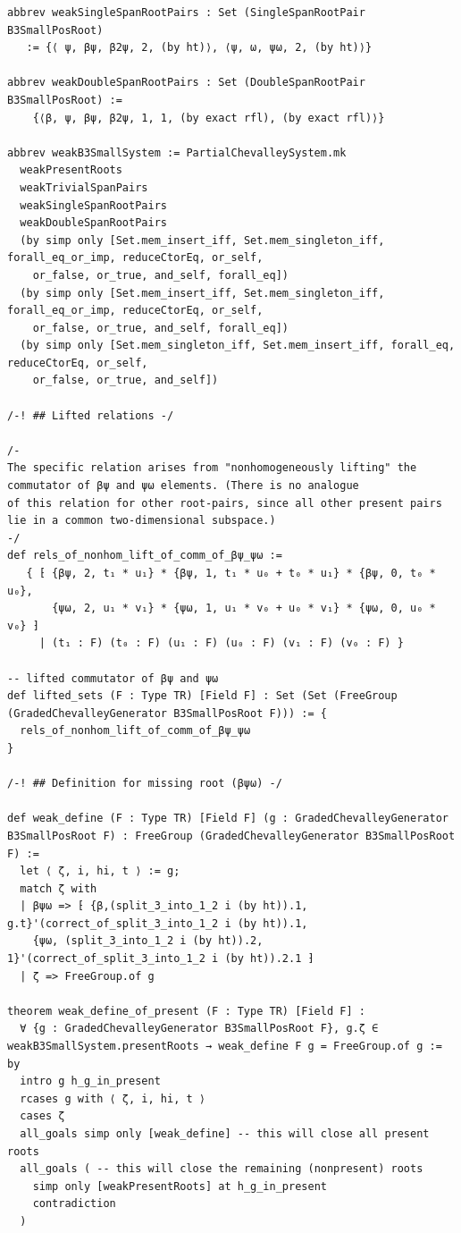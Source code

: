\documentclass[10pt,a4paper]{article}
\begin{document}
\begin{Verbatim}
abbrev weakSingleSpanRootPairs : Set (SingleSpanRootPair B3SmallPosRoot)
   := {⟨ ψ, βψ, β2ψ, 2, (by ht)⟩, ⟨ψ, ω, ψω, 2, (by ht)⟩}

abbrev weakDoubleSpanRootPairs : Set (DoubleSpanRootPair B3SmallPosRoot) :=
    {⟨β, ψ, βψ, β2ψ, 1, 1, (by exact rfl), (by exact rfl)⟩}

abbrev weakB3SmallSystem := PartialChevalleySystem.mk
  weakPresentRoots
  weakTrivialSpanPairs
  weakSingleSpanRootPairs
  weakDoubleSpanRootPairs
  (by simp only [Set.mem_insert_iff, Set.mem_singleton_iff, forall_eq_or_imp, reduceCtorEq, or_self,
    or_false, or_true, and_self, forall_eq])
  (by simp only [Set.mem_insert_iff, Set.mem_singleton_iff, forall_eq_or_imp, reduceCtorEq, or_self,
    or_false, or_true, and_self, forall_eq])
  (by simp only [Set.mem_singleton_iff, Set.mem_insert_iff, forall_eq, reduceCtorEq, or_self,
    or_false, or_true, and_self])

/-! ## Lifted relations -/

/-
The specific relation arises from "nonhomogeneously lifting" the commutator of βψ and ψω elements. (There is no analogue
of this relation for other root-pairs, since all other present pairs lie in a common two-dimensional subspace.)
-/
def rels_of_nonhom_lift_of_comm_of_βψ_ψω :=
   { ⁅ {βψ, 2, t₁ * u₁} * {βψ, 1, t₁ * u₀ + t₀ * u₁} * {βψ, 0, t₀ * u₀},
       {ψω, 2, u₁ * v₁} * {ψω, 1, u₁ * v₀ + u₀ * v₁} * {ψω, 0, u₀ * v₀} ⁆
     | (t₁ : F) (t₀ : F) (u₁ : F) (u₀ : F) (v₁ : F) (v₀ : F) }

-- lifted commutator of βψ and ψω
def lifted_sets (F : Type TR) [Field F] : Set (Set (FreeGroup (GradedChevalleyGenerator B3SmallPosRoot F))) := {
  rels_of_nonhom_lift_of_comm_of_βψ_ψω
}

/-! ## Definition for missing root (βψω) -/

def weak_define (F : Type TR) [Field F] (g : GradedChevalleyGenerator B3SmallPosRoot F) : FreeGroup (GradedChevalleyGenerator B3SmallPosRoot F) :=
  let ⟨ ζ, i, hi, t ⟩ := g;
  match ζ with
  | βψω => ⁅ {β,(split_3_into_1_2 i (by ht)).1, g.t}'(correct_of_split_3_into_1_2 i (by ht)).1,
    {ψω, (split_3_into_1_2 i (by ht)).2, 1}'(correct_of_split_3_into_1_2 i (by ht)).2.1 ⁆
  | ζ => FreeGroup.of g

theorem weak_define_of_present (F : Type TR) [Field F] :
  ∀ {g : GradedChevalleyGenerator B3SmallPosRoot F}, g.ζ ∈ weakB3SmallSystem.presentRoots → weak_define F g = FreeGroup.of g := by
  intro g h_g_in_present
  rcases g with ⟨ ζ, i, hi, t ⟩
  cases ζ
  all_goals simp only [weak_define] -- this will close all present roots
  all_goals ( -- this will close the remaining (nonpresent) roots
    simp only [weakPresentRoots] at h_g_in_present
    contradiction
  )


\end{Verbatim}
\end{document}
